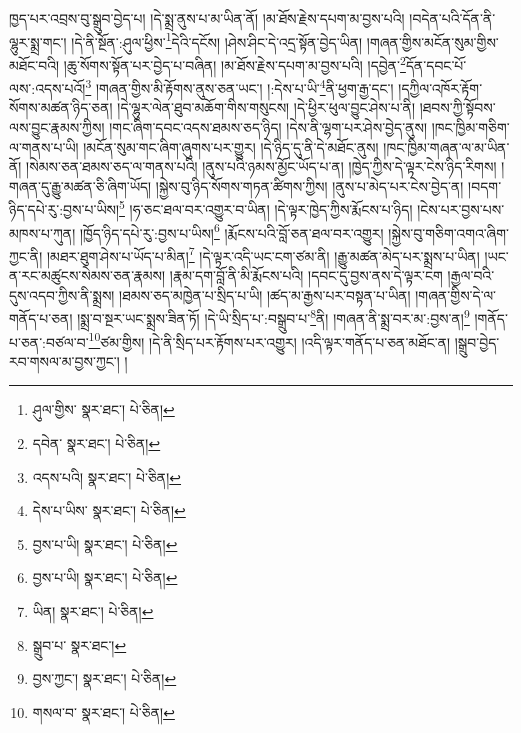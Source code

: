 ཁྱད་པར་འབྲས་བུ་སྒྲུབ་བྱེད་པ། །དེ་སྨྲ་ནུས་པ་མ་ཡིན་ནོ། །མ་ཐོས་རྗེས་དཔག་མ་བྱས་པའི། །བདེན་པའི་དོན་ནི་ལྷུར་སྨྲ་གང་། །དེ་ནི་སྔོན་:ཤུལ་ཕྱིས་\footnote{ཤུལ་གྱིས་  སྣར་ཐང་།  པེ་ཅིན། }དེའི་དངོས། །ཤེས་ཤིང་དེ་འདྲ་སྟོན་བྱེད་ཡིན། །གཞན་གྱིས་མངོན་སུམ་གྱིས་མཐོང་བའི། །ཆུ་སོགས་སྟོན་པར་བྱེད་པ་བཞིན། །མ་ཐོས་རྗེས་དཔག་མ་བྱས་པའི། །དབྱེན་\footnote{དབེན་  སྣར་ཐང་།  པེ་ཅིན། }དོན་དབང་པོ་ལས་:འདས་པའོ།\footnote{འདས་པའི།  སྣར་ཐང་།  པེ་ཅིན། } །གཞན་གྱིས་མི་རྟོགས་ནུས་ཅན་ཡང་། །:དེས་པ་ཡི་\footnote{དེས་པ་ཡིས་  སྣར་ཐང་།  པེ་ཅིན། }ནི་ཕྱག་རྒྱ་དང་། །དཀྱིལ་འཁོར་རྟོག་སོགས་མཚན་ཉིད་ཅན། །དེ་ལྷུར་ལེན་ཐུབ་མཆོག་གིས་གསུངས། །དེ་ཕྱིར་ཕུལ་བྱུང་ཤེས་པ་ནི། །ཐབས་ཀྱི་སྟོབས་ལས་བྱུང་རྣམས་ཀྱིས། །གང་ཞིག་དབང་འདས་ཐམས་ཅད་ཉིད། །དེས་ནི་ལྷག་པར་ཤེས་བྱེད་ནུས། །ཁང་ཁྱིམ་གཅིག་ལ་གནས་པ་ཡི། །མངོན་སུམ་གང་ཞིག་ཞུགས་པར་གྱུར། །དེ་ཉིད་དུ་ནི་དེ་མཐོང་ནུས། །ཁང་ཁྱིམ་གཞན་ལ་མ་ཡིན་ནོ། །སེམས་ཅན་ཐམས་ཅད་ལ་གནས་པའི། །ནུས་པའི་ཉམས་མྱོང་ཡོད་པ་ན། །ཁྱེད་ཀྱིས་དེ་ལྟར་ངེས་ཉིད་རིགས། །གཞན་དུ་རྒྱུ་མཚན་ཅི་ཞིག་ཡོད། །སྐྱེས་བུ་ཉིད་སོགས་གཏན་ཚིགས་ཀྱིས། །ནུས་པ་མེད་པར་ངེས་བྱེད་ན། །བདག་ཉིད་དཔེ་རུ་:བྱས་པ་ཡིས།\footnote{བྱས་པ་ཡི།  སྣར་ཐང་།  པེ་ཅིན། } །ཧ་ཅང་ཐལ་བར་འགྱུར་བ་ཡིན། །དེ་ལྟར་ཁྱེད་ཀྱིས་རྨོངས་པ་ཉིད། །ངེས་པར་བྱས་པས་མཁས་པ་ཀུན། །ཁྱོད་ཉིད་དཔེ་རུ་:བྱས་པ་ཡིས།\footnote{བྱས་པ་ཡི།  སྣར་ཐང་།  པེ་ཅིན། } །རྨོངས་པའི་བློ་ཅན་ཐལ་བར་འགྱུར། །སྐྱེས་བུ་གཅིག་འགའ་ཞིག་ཀྱང་ནི། །མཐར་ཐུག་ཤེས་པ་ཡོད་པ་མིན།\footnote{ཡིན།  སྣར་ཐང་།  པེ་ཅིན། } །དེ་ལྟར་འདི་ཡང་ངག་ཙམ་ནི། །རྒྱུ་མཚན་མེད་པར་སྨྲས་པ་ཡིན། །ཡང་ན་རང་མཚུངས་སེམས་ཅན་རྣམས། །རྣམ་དག་བློ་ནི་མི་རྨོངས་པའི། །དབང་དུ་བྱས་ནས་དེ་ལྟར་ངག །རྒྱལ་བའི་དུས་འདབ་ཀྱིས་ནི་སྨྲས། །ཐམས་ཅད་མཁྱེན་པ་སྲིད་པ་ཡི། །ཚད་མ་རྒྱས་པར་བསྟན་པ་ཡིན། །གཞན་གྱིས་དེ་ལ་གནོད་པ་ཅན། །སྨྲ་བ་སྔར་ཡང་སྨྲས་ཟིན་ཏོ། །དེ་ཡི་སྲིད་པ་:བསྒྲུབ་པ་\footnote{སྒྲུབ་པ་  སྣར་ཐང་། }ནི། །གཞན་ནི་སྨྲ་བར་མ་:བྱས་ན།\footnote{བྱས་ཀྱང་།  སྣར་ཐང་།  པེ་ཅིན། } །གནོད་པ་ཅན་:བཙལ་བ་\footnote{གསལ་བ་  སྣར་ཐང་།  པེ་ཅིན། }ཙམ་གྱིས། །དེ་ནི་སྲིད་པར་རྟོགས་པར་འགྱུར། །འདི་ལྟར་གནོད་པ་ཅན་མཐོང་ན། །སྒྲུབ་བྱེད་རབ་གསལ་མ་བྱས་ཀྱང་། །
